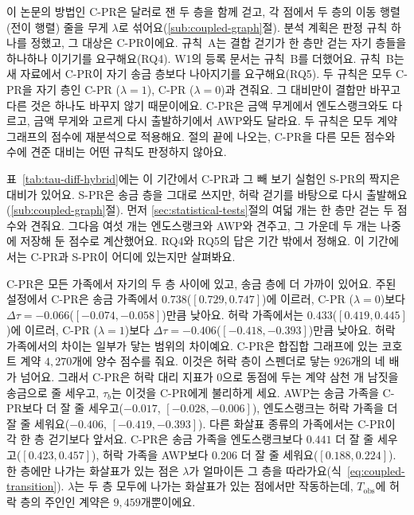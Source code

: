 


이 논문의 방법인 \mbox{C-PR}은 달러로 잰 두 층을 함께 걷고, 각 점에서 두 층의 이동 행렬(전이 행렬) 줄을 무게 $\lambda$로 섞어요(\ref{sub:coupled-graph}절). 분석 계획은 판정 규칙 하나를 정했고, 그 대상은 \mbox{C-PR}이에요. 규칙~A는 결합 걷기가 한 층만 걷는 자기 층들을 하나하나 이기기를 요구해요(RQ4). W1의 등록 문서는 규칙~B를 더했어요. 규칙~B는 새 자료에서 \mbox{C-PR}이 자기 송금 층보다 나아지기를 요구해요(RQ5). 두 규칙은 모두 \mbox{C-PR}을 자기 층인 \mbox{C-PR} ($\lambda=1$), \mbox{C-PR} ($\lambda=0$)과 견줘요. 그 대비만이 결합만 바꾸고 다른 것은 하나도 바꾸지 않기 때문이에요. \mbox{C-PR}은 금액 무게에서 엔도스랭크와도 다르고, 금액 무게와 고르게 다시 출발하기에서 AWP와도 달라요. 두 규칙은 모두 계약 그래프의 점수에 재분석으로 적용해요. 절의 끝에 나오는, \mbox{C-PR}을 다른 모든 점수와 수에 견준 대비는 어떤 규칙도 판정하지 않아요.


표~\ref{tab:tau-diff-hybrid}에는 이 기간에서 \mbox{C-PR}과 그 빼 보기 실험인 \mbox{S-PR}의 짝지은 대비가 있어요. \mbox{S-PR}은 송금 층을 그대로 쓰지만, 허락 걷기를 바탕으로 다시 출발해요(\ref{sub:coupled-graph}절). 먼저 \ref{sec:statistical-tests}절의 여덟 개는 한 층만 걷는 두 점수와 견줘요. 그다음 여섯 개는 엔도스랭크와 AWP와 견주고, 그 가운데 두 개는 나중에 저장해 둔 점수로 계산했어요. RQ4와 RQ5의 답은 기간 밖에서 정해요. 이 기간에서는 \mbox{C-PR}과 \mbox{S-PR}이 어디에 있는지만 살펴봐요.



\mbox{C-PR}은 모든 가족에서 자기의 두 층 사이에 있고, 송금 층에 더 가까이 있어요. 주된 설정에서 \mbox{C-PR}은 송금 가족에서 $0.738$($[0.729,0.747]$)에 이르러, \mbox{C-PR} ($\lambda=0$)보다 $\Delta\tau=-0.066$($[-0.074,-0.058]$)만큼 낮아요. 허락 가족에서는 $0.433$($[0.419,0.445]$)에 이르러, \mbox{C-PR} ($\lambda=1$)보다 $\Delta\tau=-0.406$($[-0.418,-0.393]$)만큼 낮아요. 허락 가족에서의 차이는 일부가 닿는 범위의 차이예요. \mbox{C-PR}은 합집합 그래프에 있는 코호트 계약 $4{,}270$개에 양수 점수를 줘요. 이것은 허락 층이 스펜더로 닿는 $926$개의 네 배가 넘어요. 그래서 \mbox{C-PR}은 허락 대리 지표가 0으로 동점에 두는 계약 삼천 개 남짓을 송금으로 줄 세우고, $\tau_b$는 이것을 \mbox{C-PR}에게 불리하게 세요. AWP는 송금 가족을 \mbox{C-PR}보다 더 잘 줄 세우고($-0.017$, $[-0.028,-0.006]$), 엔도스랭크는 허락 가족을 더 잘 줄 세워요($-0.406$, $[-0.419,-0.393]$). 다른 화살표 종류의 가족에서는 \mbox{C-PR}이 각 한 층 걷기보다 앞서요. \mbox{C-PR}은 송금 가족을 엔도스랭크보다 $0.441$ 더 잘 줄 세우고($[0.423,0.457]$), 허락 가족을 AWP보다 $0.206$ 더 잘 줄 세워요($[0.188,0.224]$). 한 층에만 나가는 화살표가 있는 점은 $\lambda$가 얼마이든 그 층을 따라가요(식~\eqref{eq:coupled-transition}). $\lambda$는 두 층 모두에 나가는 화살표가 있는 점에서만 작동하는데, $T_{\mathrm{obs}}$에 허락 층의 주인인 계약은 $9{,}459$개뿐이에요.

